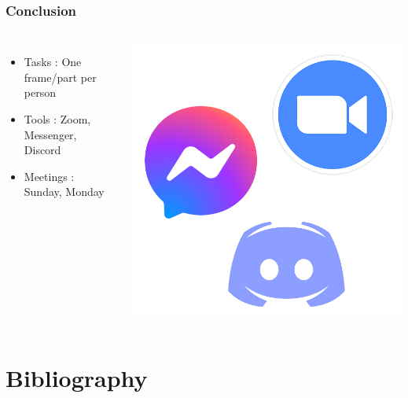 \documentclass{beamer}
\begin{document}
\begin{frame}
	\frametitle{Conclusion}
	\begin{columns}
		\begin{itemize}
			\item Tasks : One frame/part per person
			\item Tools : Zoom, Messenger, Discord
			\item Meetings : Sunday, Monday
		\end{itemize}

		\includegraphics[width=1\textwidth]{Images/Tools}
	\end{columns}

\end{frame}


\section{Bibliography}
\end{document}
